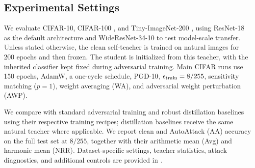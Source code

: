 \documentclass{article} %
\theoremstyle{plain}
\begin{document}
\subsection{Experimental Settings}
We evaluate CIFAR-10, CIFAR-100 \citep{krizhevsky2009learning}, and Tiny-ImageNet-200 \citep{le2015tiny}, using ResNet-18 as the default architecture and WideResNet-34-10 to test model-scale transfer. Unless stated otherwise, the clean self-teacher is trained on natural images for 200 epochs and then frozen. The student is initialized from this teacher, with the inherited classifier kept fixed during adversarial training. Main CIFAR runs use 150 epochs, AdamW, a one-cycle schedule, PGD-10, \(\epsilon_{\rm train}=8/255\), sensitivity matching (\(p=1\)), weight averaging (WA), and adversarial weight perturbation (AWP).

We compare with standard adversarial training and robust distillation baselines using their respective training recipes; distillation baselines receive the same natural teacher where applicable. We report clean and AutoAttack (AA) accuracy on the full test set at \(8/255\), together with their arithmetic mean (Avg) and harmonic mean (NRR). Dataset-specific settings, teacher statistics, attack diagnostics, and additional controls are provided in .
\end{document}
